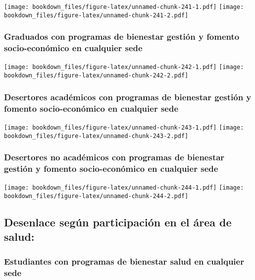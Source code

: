 \documentclass[]{article}
\theoremstyle{definition}
\theoremstyle{definition}
\theoremstyle{definition}
\theoremstyle{remark}
\begin{document}
\texttt{[image: bookdown\_files/figure-latex/unnamed-chunk-241-1.pdf]}
\texttt{[image: bookdown\_files/figure-latex/unnamed-chunk-241-2.pdf]}

\subsubsection{Graduados con programas de bienestar gestión y fomento
socio-económico en cualquier
sede}\label{graduados-con-programas-de-bienestar-gestion-y-fomento-socio-economico-en-cualquier-sede-1}

\texttt{[image: bookdown\_files/figure-latex/unnamed-chunk-242-1.pdf]}
\texttt{[image: bookdown\_files/figure-latex/unnamed-chunk-242-2.pdf]}

\subsubsection{Desertores académicos con programas de bienestar gestión
y fomento socio-económico en cualquier
sede}\label{desertores-academicos-con-programas-de-bienestar-gestion-y-fomento-socio-economico-en-cualquier-sede-1}

\texttt{[image: bookdown\_files/figure-latex/unnamed-chunk-243-1.pdf]}
\texttt{[image: bookdown\_files/figure-latex/unnamed-chunk-243-2.pdf]}

\subsubsection{Desertores no académicos con programas de bienestar
gestión y fomento socio-económico en cualquier
sede}\label{desertores-no-academicos-con-programas-de-bienestar-gestion-y-fomento-socio-economico-en-cualquier-sede-1}

\texttt{[image: bookdown\_files/figure-latex/unnamed-chunk-244-1.pdf]}
\texttt{[image: bookdown\_files/figure-latex/unnamed-chunk-244-2.pdf]}

\subsection{Desenlace según participación en el área de
salud:}\label{desenlace-segun-participacion-en-el-area-de-salud-1}

\subsubsection{Estudiantes con programas de bienestar salud en cualquier
sede}\label{estudiantes-con-programas-de-bienestar-salud-en-cualquier-sede-2}
\end{document}
